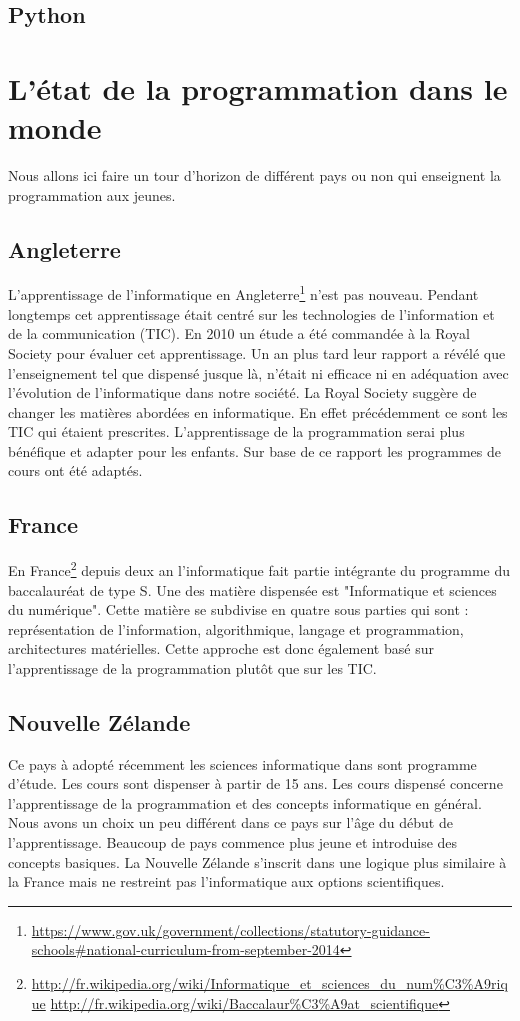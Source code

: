 \subsection{Python}


\section{L'état de la programmation dans le monde}
Nous allons ici faire un tour d'horizon de différent pays ou non qui enseignent la programmation aux jeunes. 
\subsection{Angleterre}

L'apprentissage de l'informatique en Angleterre\footnote{\url{https://www.gov.uk/government/collections/statutory-guidance-schools\#national-curriculum-from-september-2014}} n'est pas nouveau. Pendant longtemps cet apprentissage était centré sur les technologies de l'information et de la communication (TIC). En 2010 un étude a été commandée à la Royal Society pour évaluer cet apprentissage. Un an plus tard leur rapport a révélé que l'enseignement tel que dispensé jusque là, n'était ni efficace ni en adéquation avec l'évolution de l'informatique dans notre société. La Royal Society suggère de changer les matières abordées en informatique. En effet précédemment ce sont les TIC qui étaient prescrites. L'apprentissage de la programmation serai plus bénéfique et adapter pour les enfants. Sur base de ce rapport les programmes de cours ont été adaptés.


\subsection{France}
En France\footnote{\url{http://fr.wikipedia.org/wiki/Informatique\_et\_sciences\_du\_num\%C3\%A9rique}
\url{http://fr.wikipedia.org/wiki/Baccalaur\%C3\%A9at\_scientifique}} depuis deux an l'informatique fait partie intégrante du programme du baccalauréat de type S. Une des matière dispensée est "Informatique et sciences du numérique". Cette matière se subdivise en quatre sous parties qui sont : représentation de l'information, algorithmique, langage et programmation, architectures matérielles. Cette approche est donc également basé sur l'apprentissage de la programmation plutôt que sur les TIC.

\subsection{Nouvelle Zélande}
Ce pays à adopté récemment les sciences informatique dans sont programme d'étude. Les cours sont dispenser à partir de 15 ans. Les cours dispensé concerne l'apprentissage de la programmation et des concepts informatique en général. Nous avons un choix un peu différent dans ce pays sur l'âge du début de l'apprentissage. Beaucoup de pays commence plus jeune et introduise des concepts basiques. La Nouvelle Zélande s'inscrit dans une logique plus similaire à la France mais ne restreint pas l'informatique aux options scientifiques.

